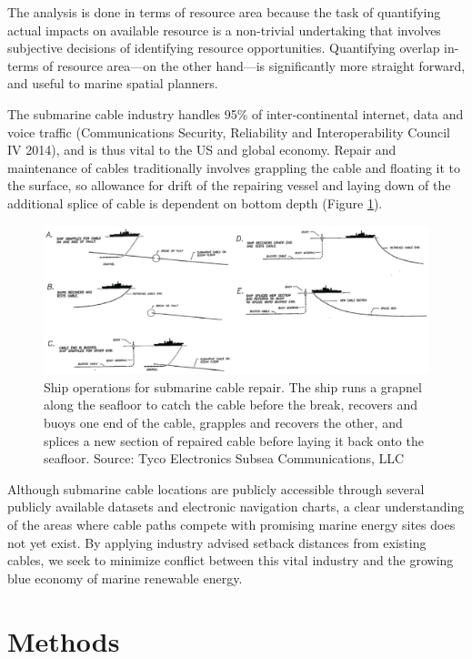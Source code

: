 \documentclass[]{article}
\begin{document}
The analysis is done in terms of resource area because the task of
quantifying actual impacts on available resource is a non-trivial
undertaking that involves subjective decisions of identifying resource
opportunities. Quantifying overlap in-terms of resource area---on the
other hand---is significantly more straight forward, and useful to
marine spatial planners.

The submarine cable industry handles 95\% of inter-continental internet,
data and voice traffic (Communications Security, Reliability and
Interoperability Council IV 2014), and is thus vital to the US and
global economy. Repair and maintenance of cables traditionally involves
grappling the cable and floating it to the surface, so allowance for
drift of the repairing vessel and laying down of the additional splice
of cable is dependent on bottom depth (Figure
\ref{fig:figSubmarineCableRepair}).

\begin{figure}
\includegraphics[width=14.17in]{figs/cable-repair-process} \caption{Ship operations for submarine cable repair. The ship runs a grapnel along the seafloor to catch the cable before the break, recovers and buoys one end of the cable, grapples and recovers the other, and splices a new section of repaired cable before laying it back onto the seafloor. Source: Tyco Electronics Subsea Communications, LLC}\label{fig:figSubmarineCableRepair}
\end{figure}

Although submarine cable locations are publicly accessible through
several publicly available datasets and electronic navigation charts, a
clear understanding of the areas where cable paths compete with
promising marine energy sites does not yet exist. By applying industry
advised setback distances from existing cables, we seek to minimize
conflict between this vital industry and the growing blue economy of
marine renewable energy.

\hypertarget{methods}{%
\section{Methods}\label{methods}}
\end{document}

